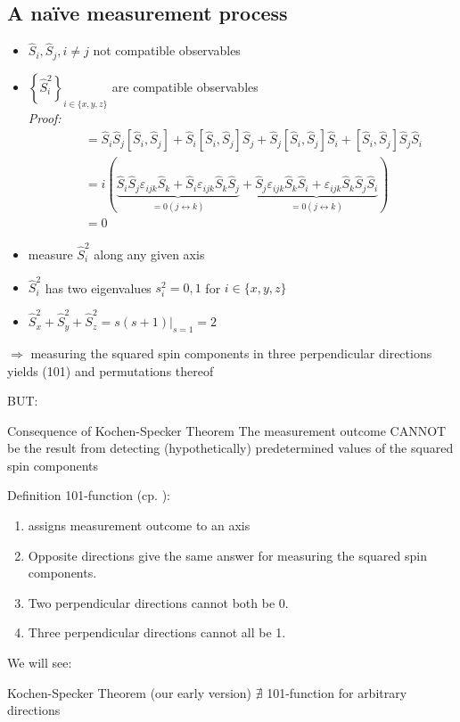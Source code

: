 \documentclass{beamer}
\begin{document}
\subsection{A na\" ive measurement process}
\begin{frame}{ }
\begin{itemize}
\item $\hat S_i,\hat S_j, i\neq j$ not compatible observables
\item $\left\{\hat S_i^2\right\}_{i\in\{x,y,z\}}$ are compatible observables\\
\textit{Proof:}
\begin{align*}
[\hat S^2_i,\hat S^2_j]&=\hat S_i\hat S_j[\hat S_i,\hat S_j]+\hat S_i[\hat S_i,\hat S_j]\hat S_j+\hat S_j [\hat S_i,\hat S_j]\hat S_i+ [\hat S_i,\hat S_j]\hat S_j\hat S_i\\ \quad& 
=i(\underbrace{\hat S_i\hat S_j\varepsilon_{ijk}\hat S_k+\hat S_i\varepsilon_{ijk}\hat S_k\hat S_j}_{=0 (j\leftrightarrow k)}+\underbrace{\hat S_j \varepsilon_{ijk}\hat S_k\hat S_i+\varepsilon_{ijk}\hat S_k\hat S_j\hat S_i}_{=0 (j\leftrightarrow k)}) \\ \quad& =0
\end{align*}
\item measure $\hat S_i^2$ along any given axis
\item $\hat S_i^2$ has two eigenvalues $s^2_i=0,1$ for $ i\in\{x,y,z\}$
\item $\hat S_x^2+\hat S_y^2+\hat S_z^2=s(s+1)|_{s=1}=2$
\end{itemize}
$\Rightarrow$ measuring the squared spin components in three perpendicular directions yields (101) and permutations thereof
\end{frame}
\begin{frame}
BUT:
\begin{block}{Consequence of Kochen-Specker Theorem}
    The measurement outcome CANNOT be the result from detecting (hypothetically) predetermined values of the squared spin components
  \end{block}
Definition 101-function (cp. \cite{conway2008strong}):
\begin{enumerate}
\item assigns measurement outcome to an axis
\item Opposite directions give the same answer for measuring the squared spin components.
\item Two perpendicular directions cannot both be 0.
\item Three perpendicular directions cannot all be 1.
\end{enumerate}
We will see:
\begin{block}{Kochen-Specker Theorem (our early version)}
    $\nexists$ 101-function for arbitrary directions
  \end{block}
\end{frame}
\end{document}
